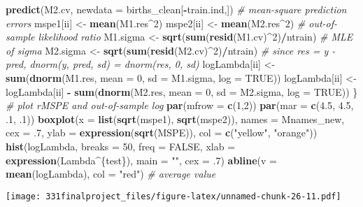 \documentclass[]{article}
\newenvironment{Shaded}{\begin{snugshade}}{\end{snugshade}}
\newcommand{\KeywordTok}[1]{\textcolor[rgb]{0.13,0.29,0.53}{\textbf{#1}}}
\newcommand{\DataTypeTok}[1]{\textcolor[rgb]{0.13,0.29,0.53}{#1}}
\newcommand{\DecValTok}[1]{\textcolor[rgb]{0.00,0.00,0.81}{#1}}
\newcommand{\FloatTok}[1]{\textcolor[rgb]{0.00,0.00,0.81}{#1}}
\newcommand{\StringTok}[1]{\textcolor[rgb]{0.31,0.60,0.02}{#1}}
\newcommand{\CommentTok}[1]{\textcolor[rgb]{0.56,0.35,0.01}{\textit{#1}}}
\newcommand{\OtherTok}[1]{\textcolor[rgb]{0.56,0.35,0.01}{#1}}
\newcommand{\OperatorTok}[1]{\textcolor[rgb]{0.81,0.36,0.00}{\textbf{#1}}}
\newcommand{\NormalTok}[1]{#1}
\begin{document}
\begin{Shaded}
\begin{Highlighting}[]
\StringTok{            }\KeywordTok{predict}\NormalTok{(M2.cv, }\DataTypeTok{newdata =}\NormalTok{ births_clean[}\OperatorTok{-}\NormalTok{train.ind,])}
  \CommentTok{# mean-square prediction errors}
\NormalTok{  mspe1[ii] <-}\StringTok{ }\KeywordTok{mean}\NormalTok{(M1.res}\OperatorTok{^}\DecValTok{2}\NormalTok{)}
\NormalTok{  mspe2[ii] <-}\StringTok{ }\KeywordTok{mean}\NormalTok{(M2.res}\OperatorTok{^}\DecValTok{2}\NormalTok{)}
  \CommentTok{# out-of-sample likelihood ratio}
\NormalTok{  M1.sigma <-}\StringTok{ }\KeywordTok{sqrt}\NormalTok{(}\KeywordTok{sum}\NormalTok{(}\KeywordTok{resid}\NormalTok{(M1.cv)}\OperatorTok{^}\DecValTok{2}\NormalTok{)}\OperatorTok{/}\NormalTok{ntrain) }\CommentTok{# MLE of sigma}
\NormalTok{  M2.sigma <-}\StringTok{ }\KeywordTok{sqrt}\NormalTok{(}\KeywordTok{sum}\NormalTok{(}\KeywordTok{resid}\NormalTok{(M2.cv)}\OperatorTok{^}\DecValTok{2}\NormalTok{)}\OperatorTok{/}\NormalTok{ntrain)}
  \CommentTok{# since res = y - pred, dnorm(y, pred, sd) = dnorm(res, 0, sd)}
\NormalTok{  logLambda[ii] <-}\StringTok{ }\KeywordTok{sum}\NormalTok{(}\KeywordTok{dnorm}\NormalTok{(M1.res, }\DataTypeTok{mean =} \DecValTok{0}\NormalTok{, }\DataTypeTok{sd =}\NormalTok{ M1.sigma, }\DataTypeTok{log =} \OtherTok{TRUE}\NormalTok{))}
\NormalTok{  logLambda[ii] <-}\StringTok{ }\NormalTok{logLambda[ii] }\OperatorTok{-}
\StringTok{                   }\KeywordTok{sum}\NormalTok{(}\KeywordTok{dnorm}\NormalTok{(M2.res, }\DataTypeTok{mean =} \DecValTok{0}\NormalTok{, }\DataTypeTok{sd =}\NormalTok{ M2.sigma, }\DataTypeTok{log =} \OtherTok{TRUE}\NormalTok{))}
\NormalTok{\}}
\CommentTok{# plot rMSPE and out-of-sample log}
\KeywordTok{par}\NormalTok{(}\DataTypeTok{mfrow =} \KeywordTok{c}\NormalTok{(}\DecValTok{1}\NormalTok{,}\DecValTok{2}\NormalTok{))}
\KeywordTok{par}\NormalTok{(}\DataTypeTok{mar =} \KeywordTok{c}\NormalTok{(}\FloatTok{4.5}\NormalTok{, }\FloatTok{4.5}\NormalTok{, .}\DecValTok{1}\NormalTok{, .}\DecValTok{1}\NormalTok{))}
\KeywordTok{boxplot}\NormalTok{(}\DataTypeTok{x =} \KeywordTok{list}\NormalTok{(}\KeywordTok{sqrt}\NormalTok{(mspe1), }\KeywordTok{sqrt}\NormalTok{(mspe2)), }
        \DataTypeTok{names =}\NormalTok{ Mnames_new, }\DataTypeTok{cex =}\NormalTok{ .}\DecValTok{7}\NormalTok{,}
        \DataTypeTok{ylab =} \KeywordTok{expression}\NormalTok{(}\KeywordTok{sqrt}\NormalTok{(MSPE)), }\DataTypeTok{col =} \KeywordTok{c}\NormalTok{(}\StringTok{"yellow"}\NormalTok{, }\StringTok{"orange"}\NormalTok{))}
\KeywordTok{hist}\NormalTok{(logLambda, }\DataTypeTok{breaks =} \DecValTok{50}\NormalTok{, }\DataTypeTok{freq =} \OtherTok{FALSE}\NormalTok{,}
     \DataTypeTok{xlab =} \KeywordTok{expression}\NormalTok{(Lambda}\OperatorTok{^}\NormalTok{\{test\}),}
     \DataTypeTok{main =} \StringTok{""}\NormalTok{, }\DataTypeTok{cex =}\NormalTok{ .}\DecValTok{7}\NormalTok{)}
\KeywordTok{abline}\NormalTok{(}\DataTypeTok{v =} \KeywordTok{mean}\NormalTok{(logLambda), }\DataTypeTok{col =} \StringTok{"red"}\NormalTok{) }\CommentTok{# average value}
\end{Highlighting}
\end{Shaded}

\texttt{[image: 331finalproject\_files/figure-latex/unnamed-chunk-26-11.pdf]}
\end{document}
